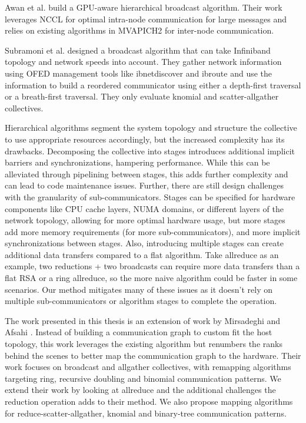 Awan et al. \cite{Awan2016NCCLBcast} build a GPU-aware hierarchical broadcast algorithm.
Their work leverages NCCL for optimal intra-node communication for large messages and relies on existing algorithms in MVAPICH2 for inter-node communication.

Subramoni et al. \cite{Subramoni2011SpeedAwareBcast} designed a broadcast algorithm that can take Infiniband topology and network speeds into account.
They gather network information using OFED management tools like ibnetdiscover and ibroute and use the information to build a reordered communicator using either a depth-first traversal or a breath-first traversal.
They only evaluate knomial and scatter-allgather collectives.

Hierarchical algorithms segment the system topology and structure the collective to use appropriate resources accordingly, but the increased complexity has its drawbacks.
Decomposing the collective into stages introduces additional implicit barriers and synchronizations, hampering performance. 
While this can be alleviated through pipelining between stages, this adds further complexity and can lead to code maintenance issues.
Further, there are still design challenges with the granularity of sub-communicators.
Stages can be specified for hardware components like CPU cache layers, NUMA domains, or different layers of the network topology, allowing for more optimal hardware usage, but more stages add more memory requirements (for more sub-communicators), and more implicit synchronizations between stages.
Also, introducing multiple stages can create additional data transfers compared to a flat algorithm.
Take allreduce as an example, two reductions + two broadcasts can require more data transfers than a flat RSA or a ring allreduce, so the more naive algorithm could be faster in some scenarios. 
Our method mitigates many of these issues as it doesn't rely on multiple sub-communicators or algorithm stages to complete the operation.

The work presented in this thesis is an extension of work by Mirsadeghi and Afsahi \cite{Mirsadeghi2016TopoAwareCollRR}.
Instead of building a communication graph to custom fit the host topology, this work leverages the existing algorithm but renumbers the ranks behind the scenes to better map the communication graph to the hardware.
Their work focuses on broadcast and allgather collectives, with remapping algorithms targeting ring, recursive doubling and binomial communication patterns.
We extend their work by looking at allreduce and the additional challenges the reduction operation adds to their method.
We also propose mapping algorithms for reduce-scatter-allgather, knomial and binary-tree communication patterns.

